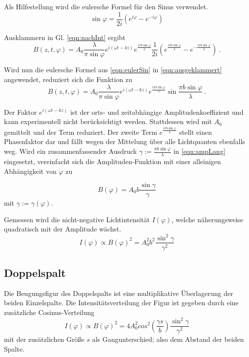 Als Hilfestellung wird die eulersche Formel für den Sinus verwendet.
\begin{equation}
  \sin{\varphi} = \frac{1}{2i}(e^{i\varphi}-e^{-i\varphi})
  \label{eqn:eulerSin}
\end{equation}

Ausklammern in Gl. \eqref{eqn:nachInt} ergibt
\begin{equation}
  B(z, t, \varphi) = A_0\frac{\lambda}{\pi \sin{\varphi}}e^{i(\omega t - kz)}e^{\frac{i\pi b \sin{\varphi}}{\lambda}}\frac{1}{2i}(e^{\frac{i\pi b \sin{\varphi}}{\lambda}}-e^{-\frac{i\pi b \sin{\varphi}}{\lambda}}) \:.
  \label{eqn:ausgeklammert}
\end{equation}

Wird nun die eulersche Formel aus \eqref{eqn:eulerSin} in \eqref{eqn:ausgeklammert} angewendet, reduziert sich die Funktion zu
\begin{equation}
  B(z, t, \varphi) = A_0\frac{\lambda}{\pi \sin{\varphi}}e^{i(\omega t - kz)}e^{\frac{i\pi b \sin{\varphi}}{\lambda}}\sin{\frac{\pi b \sin{\varphi}}{\lambda}} \:.
  \label{eqn:ampLang}
\end{equation}

Der Faktor $e^{i(\omega t - kz)}$ ist der orts- und zeitabhängige Amplitudenkoeffizient und kann experimentell nicht berücksichtigt werden. Stattdessen wird mit $A_0$ gemittelt
und der Term reduziert.
Der zweite Term $e^{\frac{i\pi b \sin{\varphi}}{\lambda}}$ stellt einen Phasenfaktor dar und fällt wegen der Mittelung über alle Lichtquanten ebenfalls weg.
Wird ein zusammenfassender Ausdruck $\gamma := \frac{\pi b \sin{\varphi}}{\lambda}$ in \eqref{eqn:ampLang} eingesetzt, vereinfacht sich die Amplituden-Funktion mit einer alleinigen Abhängigkeit von $\varphi$ zu

\begin{equation}
  B(\varphi) = A_0b\frac{\sin{\gamma}}{\gamma}
\end{equation}
mit $\gamma := \gamma(\varphi)$.

Gemessen wird die nicht-negative Lichtintensität $I(\varphi)$, welche näherungsweise quadratisch mit der Amplitude wächst.
\begin{equation}
  I(\varphi) \propto B(\varphi)^2 = A_0^2b^2\frac{\sin^2{\gamma}}{\gamma^2}
  \label{eqn:I}
\end{equation}

\subsection{Doppelspalt}
Die Beugungsfigur des Doppelspalts ist eine multiplikative Überlagerung der beiden Einzelspalte.
Die Intensitätsverteilung der Figur ist gegeben durch eine zusätzliche Cosinus-Verteilung\cite{Versuchsanleitung}
\begin{equation}
  I(\varphi) \propto B(\varphi)^2 = 4A_0^2cos^2{(\frac{\gamma s}{b})}\frac{\sin^2{\gamma}}{\gamma^2}
  \label{eqn:doppelspalt}
\end{equation}
mit der zusätzlichen Größe $s$ als Gangunterschied; also dem Abstand der beiden Spalte.

